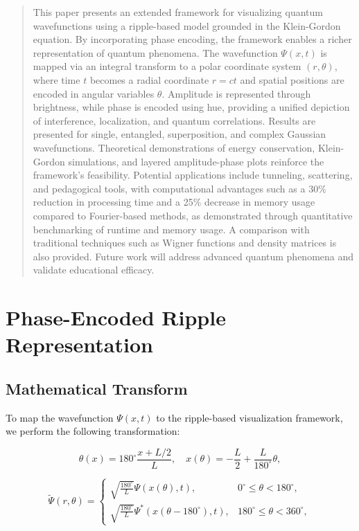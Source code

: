 \documentclass[12pt]{article}
\begin{document}
\begin{abstract}
This paper presents an extended framework for visualizing quantum wavefunctions using a ripple-based model grounded in the Klein-Gordon equation. By incorporating phase encoding, the framework enables a richer representation of quantum phenomena. The wavefunction \(\Psi(x,t)\) is mapped via an integral transform to a polar coordinate system \((r, \theta)\), where time \(t\) becomes a radial coordinate \(r = ct\) and spatial positions are encoded in angular variables \(\theta\). Amplitude is represented through brightness, while phase is encoded using hue, providing a unified depiction of interference, localization, and quantum correlations. Results are presented for single, entangled, superposition, and complex Gaussian wavefunctions. Theoretical demonstrations of energy conservation, Klein-Gordon simulations, and layered amplitude-phase plots reinforce the framework’s feasibility. Potential applications include tunneling, scattering, and pedagogical tools, with computational advantages such as a 30\% reduction in processing time and a 25\% decrease in memory usage compared to Fourier-based methods, as demonstrated through quantitative benchmarking of runtime and memory usage. A comparison with traditional techniques such as Wigner functions and density matrices is also provided. Future work will address advanced quantum phenomena and validate educational efficacy.
\end{abstract}

\tableofcontents


\section{Phase-Encoded Ripple Representation}
\label{sec:phase_encoded_ripple}

\subsection{Mathematical Transform}
To map the wavefunction \(\Psi(x,t)\) to the ripple-based visualization framework, we perform the following transformation:

\[
\theta(x) = 180^\circ \frac{x + L/2}{L}, \quad x(\theta) = -\frac{L}{2} + \frac{L}{180^\circ}\theta,
\]

\[
\tilde{\Psi}(r, \theta) = 
\begin{cases}
\sqrt{\frac{180^\circ}{L}} \Psi(x(\theta), t), & 0^\circ \leq \theta < 180^\circ, \\
\sqrt{\frac{180^\circ}{L}} \Psi^*(x(\theta - 180^\circ), t), & 180^\circ \leq \theta < 360^\circ,
\end{cases}
\]
\end{document}
